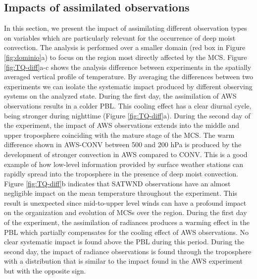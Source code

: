 \documentclass[final,5p,times,twocolumn,authoryear]{elsarticle} %
\begin{document}
\hypertarget{impacts-of-assimilated-observations}{%
\subsection{Impacts of assimilated observations}\label{impacts-of-assimilated-observations}}

In this section, we present the impact of assimilating different observation types on variables which are particularly relevant for the occurrence of deep moist convection. The analysis is performed over a smaller domain (red box in Figure \ref{fig:dominio}a) to focus on the region most directly affected by the MCS. Figure \ref{fig:TQ-diff}a-c shows the analysis difference between experiments in the spatially averaged vertical profile of temperature. By averaging the differences between two experiments we can isolate the systematic impact produced by different observing systems on the analyzed state. During the first day, the assimilation of AWS observations results in a colder PBL. This cooling effect has a clear diurnal cycle, being stronger during nighttime (Figure \ref{fig:TQ-diff}a). During the second day of the experiment, the impact of AWS observations extends into the middle and upper troposphere coinciding with the mature stage of the MCS. The warm difference shown in AWS-CONV between 500 and 200 hPa is produced by the development of stronger convection in AWS compared to CONV. This is a good example of how low-level information provided by surface weather stations can rapidly spread into the troposphere in the presence of deep moist convection. Figure \ref{fig:TQ-diff}b indicates that SATWND observations have an almost negligible impact on the mean temperature throughout the experiment. This result is unexpected since mid-to-upper level winds can have a profound impact on the organization and evolution of MCSs over the region.
During the first day of the experiment, the assimilation of radiances produces a warming effect in the PBL which partially compensates for the cooling effect of AWS observations. No clear systematic impact is found above the PBL during this period. During the second day, the impact of radiance observations is found through the troposphere with a distribution that is similar to the impact found in the AWS experiment but with the opposite sign.
\end{document}
